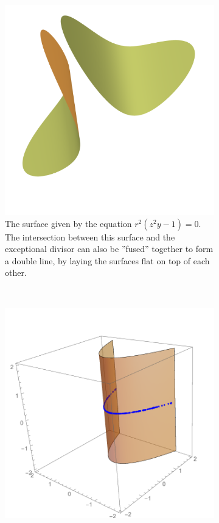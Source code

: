 \documentclass{article}
\begin{document}
\begin{example}
\begin{figure}[h!]
\begin{subfigure}[t]{0.3\textwidth}
                \includegraphics[width=\textwidth]{pictures/line_blowup_affine_2.png} 
                \caption{The surface given by the equation $r^2(z^2y - 1) = 0$. The
                    intersection between this surface and the exceptional divisor can
                    also be ''fused'' together to form a double line, by laying the
                surfaces flat on top of each other.}
            \end{subfigure}
            \\
            \begin{subfigure}[t]{0.3\textwidth}
                \includegraphics[width=\textwidth]{pictures/affine_1_exceptional.pdf} 

\end{subfigure}
\end{figure}
\end{example}
\end{document}
